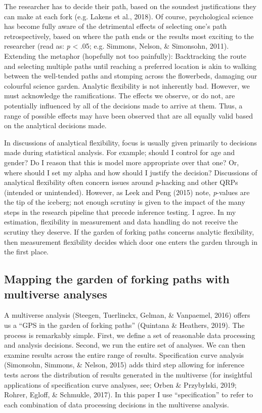 \documentclass[english,man,floatsintext]{apa6}
\begin{document}
The researcher has to decide their path, based on the soundest justifications they can make at each fork (e.g. Lakens et al., 2018). Of course, psychological science has become fully aware of the detrimental effects of selecting one's path retrospectively, based on where the path ends or the results most exciting to the researcher (read as: \emph{p} \textless{} .05; e.g. Simmons, Nelson, \& Simonsohn, 2011). Extending the metaphor (hopefully not too painfully): Backtracking the route and selecting multiple paths until reaching a preferred location is akin to walking between the well-tended paths and stomping across the flowerbeds, damaging our colourful science garden. Analytic flexibility is not inherently bad. However, we must acknowledge the ramifications. The effects we observe, or do not, are potentially influenced by all of the decisions made to arrive at them. Thus, a range of possible effects may have been observed that are all equally valid based on the analytical decisions made.

In discussions of analytical flexibility, focus is usually given primarily to decisions made during statistical analysis. For example; should I control for age and gender? Do I reason that this is model more appropriate over that one? Or, where should I set my alpha and how should I justify the decision? Discussions of analytical flexibility often concern issues around \emph{p}-hacking and other QRPs (intended or unintended). However, as Leek and Peng (2015) note, \emph{p}-values are the tip of the iceberg; not enough scrutiny is given to the impact of the many steps in the research pipeline that precede inference testing. I agree. In my estimation, flexibility in measurement and data handling do not receive the scrutiny they deserve. If the garden of forking paths concerns analytic flexibility, then measurement flexibility decides which door one enters the garden through in the first place.

\hypertarget{mapping-the-garden-of-forking-paths-with-multiverse-analyses}{%
\subsection{Mapping the garden of forking paths with multiverse analyses}\label{mapping-the-garden-of-forking-paths-with-multiverse-analyses}}

A multiverse analysis (Steegen, Tuerlinckx, Gelman, \& Vanpaemel, 2016) offers us a \enquote{GPS in the garden of forking paths} (Quintana \& Heathers, 2019). The process is remarkably simple. First, we define a set of reasonable data processing and analysis decisions. Second, we run the entire set of analyses. We can then examine results across the entire range of results. Specification curve analysis (Simonsohn, Simmons, \& Nelson, 2015) adds third step allowing for inference tests across the distribution of results generated in the multiverse (for insightful applications of specification curve analyses, see; Orben \& Przybylski, 2019; Rohrer, Egloff, \& Schmukle, 2017). In this paper I use \enquote{specification} to refer to each combination of data processing decisions in the multiverse analysis.
\end{document}
